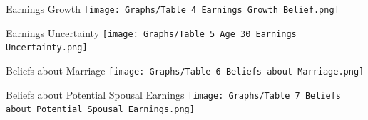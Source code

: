 \documentclass[12pt]{beamer}
\begin{document}
\begin{frame}{Earnings Growth}
    \texttt{[image: Graphs/Table 4 Earnings Growth Belief.png]}
\end{frame}

\begin{frame}{Earnings Uncertainty}
    \texttt{[image: Graphs/Table 5 Age 30 Earnings Uncertainty.png]}
\end{frame}

\begin{frame}{Beliefs about Marriage}
    \texttt{[image: Graphs/Table 6 Beliefs about Marriage.png]}
\end{frame}

\begin{frame}{Beliefs about Potential Spousal Earnings}
    \texttt{[image: Graphs/Table 7 Beliefs about Potential Spousal Earnings.png]}
\end{frame}
\end{document}
